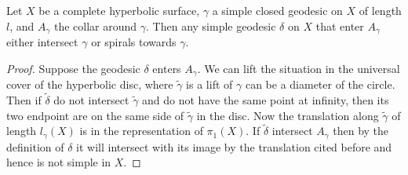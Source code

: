 \begin{cor}
Let $X$ be a complete hyperbolic surface, $\gamma$ a simple closed geodesic on $X$ of length $l$, and $A_{\gamma}$ the collar around $\gamma$. Then any simple geodesic $\delta$ on $X$ that enter $A_{\gamma}$ either intersect $\gamma$ or spirals towards $\gamma$.
\end{cor}

\begin{proof}
Suppose the geodesic $\delta$ enters $A_{\gamma}$. We can lift the situation in the universal cover of the hyperbolic disc, where $\tilde{\gamma}$ is a lift of $\gamma$ can be a diameter of the circle. Then if $\tilde{\delta}$ do not intersect $\tilde{\gamma}$ and do not have the same point at infinity, then its two endpoint are on the same side of $\tilde{\gamma}$ in the disc. Now the translation along $\tilde{\gamma}$ of length $l_{\gamma}(X)$ is in the representation of $\pi_1(X)$. If $\tilde{\delta}$ intersect $A_{\gamma}$ then by the definition of $\delta$ it will intersect with its image by the translation cited before and hence is not simple in $X$.
\end{proof}
